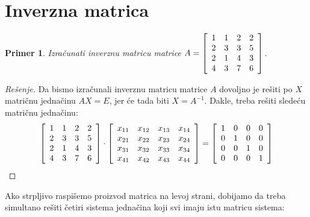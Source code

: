 \documentclass[10pt, a4paper]{article}
\newtheorem{example}{Primer}
\begin{document}
\pagebreak
\section{Inverzna matrica}
\begin{example}
    {Izra\v{c}unati inverznu matricu matrice} $A = \left[\begin{array}[]{cccc}
        1 & 1 & 2 & 2 \\
        2 & 3 & 3 & 5 \\
        2 & 1 & 4 & 3 \\
        4 & 3 & 7 & 6 \\
    \end{array}\right]$.
\end{example}
\begin{proof}[Re\v{s}enje]
    Da bismo izra\v{c}unali inverznu matricu matrice $A$ dovoljno je re\v{s}iti po $X$ matri\v{c}nu
    jedna\v{c}inu $AX = E$, jer \'ce tada biti $X = A^{-1}$. Dakle, treba re\v{s}iti slede\'cu matri\v{c}nu jedna\v{c}inu:
\[
    \left[ 
    \begin{array}[]{cccc}
        1 & 1 & 2 & 2 \\
        2 & 3 & 3 & 5 \\
        2 & 1 & 4 & 3 \\
        4 & 3 & 7 & 6 \\
    \end{array}
    \right] \cdot
    \left[ 
    \begin{array}[]{cccc}
        x_{11} & x_{12} & x_{13} & x_{14} \\
        x_{21} & x_{22} & x_{23} & x_{24} \\
        x_{31} & x_{32} & x_{33} & x_{34} \\
        x_{41} & x_{42} & x_{43} & x_{44} \\
    \end{array}
    \right] = 
    \left[ 
    \begin{array}[]{cccc}
        1 & 0 & 0 & 0 \\
        0 & 1 & 0 & 0 \\
        0 & 0 & 1 & 0 \\
        0 & 0 & 0 & 1 \\
    \end{array}
    \right]
\]
\end{proof}

Ako strpljivo raspi\v{s}emo proizvod matrica na levoj strani, dobijamo da treba simultano re\v{s}iti
\v{c}etiri sistema jedna\v{c}ina koji svi imaju istu matricu sistema:
\end{document}
